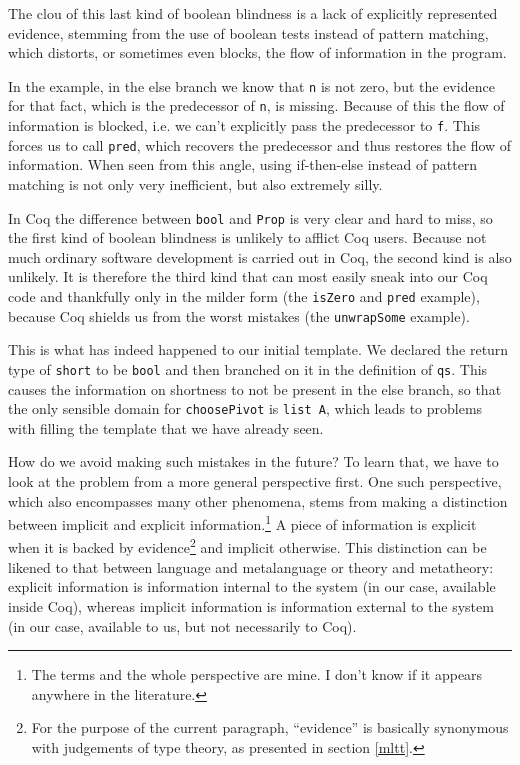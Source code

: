 \documentclass[declaration,mgr,english,shortabstract]{iithesis}
\newcommand{\m}[1]{\texttt{#1}}
\begin{document}
The clou of this last kind of boolean blindness is a lack of explicitly represented evidence, stemming from the use of boolean tests instead of pattern matching, which distorts, or sometimes even blocks, the flow of information in the program.

In the example, in the else branch we know that \m{n} is not zero, but the evidence for that fact, which is the predecessor of \m{n}, is missing. Because of this the flow of information is blocked, i.e. we can't explicitly pass the predecessor to \m{f}. This forces us to call \m{pred}, which recovers the predecessor and thus restores the flow of information. When seen from this angle, using if-then-else instead of pattern matching is not only very inefficient, but also extremely silly.

In Coq the difference between \m{bool} and \m{Prop} is very clear and hard to miss, so the first kind of boolean blindness is unlikely to afflict Coq users. Because not much ordinary software development is carried out in Coq, the second kind is also unlikely. It is therefore the third kind that can most easily sneak into our Coq code and thankfully only in the milder form (the \m{isZero} and \m{pred} example), because Coq shields us from the worst mistakes (the \m{unwrapSome} example).

This is what has indeed happened to our initial template. We declared the return type of \m{short} to be \m{bool} and then branched on it in the definition of \m{qs}. This causes the information on shortness to not be present in the else branch, so that the only sensible domain for \m{choosePivot} is \m{list A}, which leads to problems with filling the template that we have already seen.

How do we avoid making such mistakes in the future? To learn that, we have to look at the problem from a more general perspective first. One such perspective, which also encompasses many other phenomena, stems from making a distinction between implicit and explicit information.\footnote{The terms and the whole perspective are mine. I don't know if it appears anywhere in the literature.} A piece of information is explicit when it is backed by evidence\footnote{For the purpose of the current paragraph, ``evidence'' is basically synonymous with judgements of type theory, as presented in section \ref{mltt}.} and implicit otherwise. This distinction can be likened to that between language and metalanguage or theory and metatheory: explicit information is information internal to the system (in our case, available inside Coq), whereas implicit information is information external to the system (in our case, available to us, but not necessarily to Coq).
\end{document}
